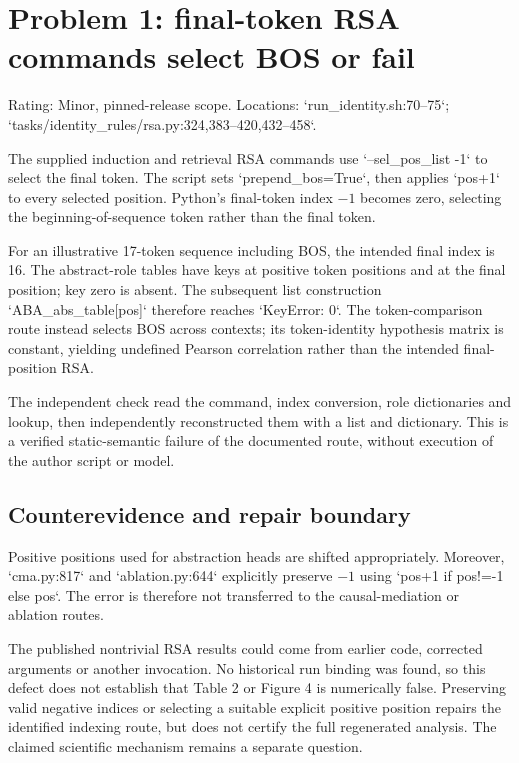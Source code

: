\documentclass[10pt]{article}
\begin{document}
\section*{Problem 1: final-token RSA commands select BOS or fail}
Rating: Minor, pinned-release scope. Locations: `run\_identity.sh:70--75`; `tasks/identity\_rules/rsa.py:324,383--420,432--458`.\par
The supplied induction and retrieval RSA commands use `–sel\_pos\_list -1` to select the final token. The script sets `prepend\_bos=True`, then applies `pos+1` to every selected position. Python’s final-token index \(-1\) becomes zero, selecting the beginning-of-sequence token rather than the final token.\par
For an illustrative 17-token sequence including BOS, the intended final index is 16. The abstract-role tables have keys at positive token positions and at the final position; key zero is absent. The subsequent list construction `ABA\_abs\_table[pos]` therefore reaches `KeyError: 0`. The token-comparison route instead selects BOS across contexts; its token-identity hypothesis matrix is constant, yielding undefined Pearson correlation rather than the intended final-position RSA.\par
The independent check read the command, index conversion, role dictionaries and lookup, then independently reconstructed them with a list and dictionary. This is a verified static-semantic failure of the documented route, without execution of the author script or model.\par
\subsection*{Counterevidence and repair boundary}
Positive positions used for abstraction heads are shifted appropriately. Moreover, `cma.py:817` and `ablation.py:644` explicitly preserve \(-1\) using `pos+1 if pos!=-1 else pos`. The error is therefore not transferred to the causal-mediation or ablation routes.\par
The published nontrivial RSA results could come from earlier code, corrected arguments or another invocation. No historical run binding was found, so this defect does not establish that Table 2 or Figure 4 is numerically false. Preserving valid negative indices or selecting a suitable explicit positive position repairs the identified indexing route, but does not certify the full regenerated analysis. The claimed scientific mechanism remains a separate question.\par
\end{document}
